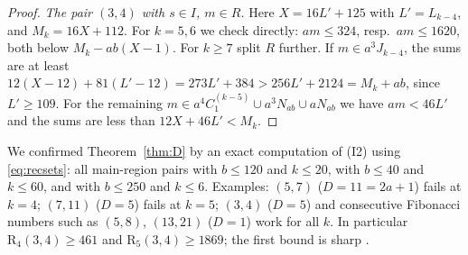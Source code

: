 \documentclass[11pt,a4paper]{article}
\theoremstyle{definition}
\theoremstyle{remark}
\newcommand{\R}{\mathrm{R}}
\begin{document}
\begin{proof}
\medskip\noindent\emph{The pair $(3,4)$ with $s\in I$, $m\in R$.} Here $X=16L'+125$ with $L'=L_{k-4}$, and $M_k=16X+112$. For $k=5,6$ we check directly: $am\le324$, resp.\ $am\le1620$, both below $M_k-ab(X-1)$. For $k\ge7$ split $R$ further. If $m\in a^3J_{k-4}$, the sums are at least $12(X-12)+81(L'-12)=273L'+384>256L'+2124=M_k+ab$, since $L'\ge109$. For the remaining $m\in a^4C_1^{(k-5)}\cup a^3N_{ab}\cup aN_{ab}$ we have $am<46L'$ and the sums are less than $12X+46L'<M_k$.
\end{proof}

We confirmed Theorem~\ref{thm:D} by an exact computation of (I2) using \eqref{eq:recsets}: all main-region pairs with $b\le120$ and $k\le20$, with $b\le40$ and $k\le60$, and with $b\le250$ and $k\le6$. Examples: $(5,7)$ ($D=11=2a+1$) fails at $k=4$; $(7,11)$ ($D=5$) fails at $k=5$; $(3,4)$ ($D=5$) and consecutive Fibonacci numbers such as $(5,8)$, $(13,21)$ ($D=1$) work for all $k$. In particular $\R_4(3,4)\ge461$ and $\R_5(3,4)\ge1869$; the first bound is sharp \cite{Ich26b}.
\end{document}
